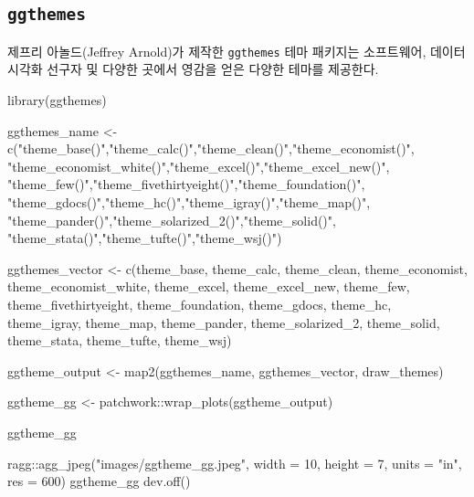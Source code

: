 \documentclass[
  letterpaper,
]{book}
\newenvironment{Shaded}{\begin{snugshade}}{\end{snugshade}}
\newcommand{\AttributeTok}[1]{\textcolor[rgb]{0.40,0.45,0.13}{#1}}
\newcommand{\DecValTok}[1]{\textcolor[rgb]{0.68,0.00,0.00}{#1}}
\newcommand{\FunctionTok}[1]{\textcolor[rgb]{0.28,0.35,0.67}{#1}}
\newcommand{\NormalTok}[1]{\textcolor[rgb]{0.00,0.23,0.31}{#1}}
\newcommand{\OtherTok}[1]{\textcolor[rgb]{0.00,0.23,0.31}{#1}}
\newcommand{\SpecialCharTok}[1]{\textcolor[rgb]{0.37,0.37,0.37}{#1}}
\newcommand{\StringTok}[1]{\textcolor[rgb]{0.13,0.47,0.30}{#1}}
\begin{document}
\hypertarget{ggthemes}{%
\subsection{\texorpdfstring{\texttt{ggthemes}}{ggthemes}}\label{ggthemes}}

제프리 아놀드(Jeffrey Arnold)가 제작한 \texttt{ggthemes} 테마 패키지는
소프트웨어, 데이터 시각화 선구자 및 다양한 곳에서 영감을 얻은 다양한
테마를 제공한다.

\begin{Shaded}
\begin{Highlighting}[]
\FunctionTok{library}\NormalTok{(ggthemes)}

\NormalTok{ggthemes\_name }\OtherTok{\textless{}{-}} \FunctionTok{c}\NormalTok{(}\StringTok{"theme\_base()"}\NormalTok{,}\StringTok{"theme\_calc()"}\NormalTok{,}\StringTok{"theme\_clean()"}\NormalTok{,}\StringTok{"theme\_economist()"}\NormalTok{,}
                   \StringTok{"theme\_economist\_white()"}\NormalTok{,}\StringTok{"theme\_excel()"}\NormalTok{,}\StringTok{"theme\_excel\_new()"}\NormalTok{,}
                   \StringTok{"theme\_few()"}\NormalTok{,}\StringTok{"theme\_fivethirtyeight()"}\NormalTok{,}\StringTok{"theme\_foundation()"}\NormalTok{,}
                   \StringTok{"theme\_gdocs()"}\NormalTok{,}\StringTok{"theme\_hc()"}\NormalTok{,}\StringTok{"theme\_igray()"}\NormalTok{,}\StringTok{"theme\_map()"}\NormalTok{,}
                   \StringTok{"theme\_pander()"}\NormalTok{,}\StringTok{"theme\_solarized\_2()"}\NormalTok{,}\StringTok{"theme\_solid()"}\NormalTok{,}
                   \StringTok{"theme\_stata()"}\NormalTok{,}\StringTok{"theme\_tufte()"}\NormalTok{,}\StringTok{"theme\_wsj()"}\NormalTok{)}

\NormalTok{ggthemes\_vector }\OtherTok{\textless{}{-}} \FunctionTok{c}\NormalTok{(theme\_base, theme\_calc, theme\_clean, theme\_economist, theme\_economist\_white,}
\NormalTok{                     theme\_excel, theme\_excel\_new, theme\_few, theme\_fivethirtyeight,}
\NormalTok{                     theme\_foundation, theme\_gdocs, theme\_hc, theme\_igray, theme\_map,}
\NormalTok{                     theme\_pander, theme\_solarized\_2, theme\_solid, theme\_stata, theme\_tufte, }
\NormalTok{                     theme\_wsj)}

\NormalTok{ggtheme\_output }\OtherTok{\textless{}{-}} \FunctionTok{map2}\NormalTok{(ggthemes\_name, ggthemes\_vector, draw\_themes)}

\NormalTok{ggtheme\_gg }\OtherTok{\textless{}{-}}\NormalTok{ patchwork}\SpecialCharTok{::}\FunctionTok{wrap\_plots}\NormalTok{(ggtheme\_output)}

\NormalTok{ggtheme\_gg}

\NormalTok{ragg}\SpecialCharTok{::}\FunctionTok{agg\_jpeg}\NormalTok{(}\StringTok{"images/ggtheme\_gg.jpeg"}\NormalTok{,}
               \AttributeTok{width =} \DecValTok{10}\NormalTok{, }\AttributeTok{height =} \DecValTok{7}\NormalTok{, }\AttributeTok{units =} \StringTok{"in"}\NormalTok{, }\AttributeTok{res =} \DecValTok{600}\NormalTok{)}
\NormalTok{ggtheme\_gg}
\FunctionTok{dev.off}\NormalTok{()}
\end{Highlighting}
\end{Shaded}
\end{document}
